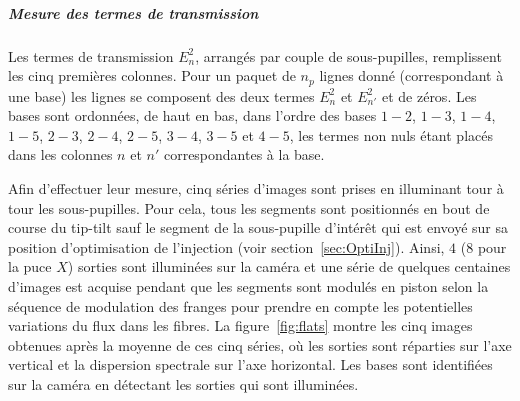 \begin{figure}[ht!]
    \label{fig:V2PMP2VMmesure}
\end{figure}


\subparagraph{Mesure des termes de transmission \\}

Les termes de transmission $E_{n}^2$, arrangés par couple de sous-pupilles,  remplissent les cinq premières colonnes. Pour un paquet de $n_p$ lignes donné (correspondant à une base) les lignes se composent des deux termes $E_{n}^2$ et $E_{n'}^2$ et de zéros. Les bases sont ordonnées, de haut en bas, dans l'ordre des bases $1-2$, $1-3$, $1-4$, $1-5$, $2-3$, $2-4$, $2-5$, $3-4$, $3-5$ et $4-5$, les termes non nuls étant placés dans les colonnes $n$ et $n'$ correspondantes à la base.

Afin d'effectuer leur mesure, cinq séries d'images sont prises en illuminant tour à tour les sous-pupilles. Pour cela, tous les segments sont positionnés en bout de course du tip-tilt sauf le segment de la sous-pupille d'intérêt qui est envoyé sur sa position d'optimisation de l'injection (voir section~\ref{sec:OptiInj}). Ainsi, $4$ ($8$ pour la puce $X$) sorties sont illuminées sur la caméra et une série de quelques centaines d'images est acquise pendant que les segments sont modulés en piston selon la séquence de modulation des franges pour prendre en compte les potentielles variations du flux dans les fibres. La figure~\ref{fig:flats} montre les cinq images obtenues après la moyenne de ces cinq séries, où les sorties sont réparties sur l'axe vertical et la dispersion spectrale sur l'axe horizontal. Les bases sont identifiées sur la caméra en détectant les sorties qui sont illuminées.

